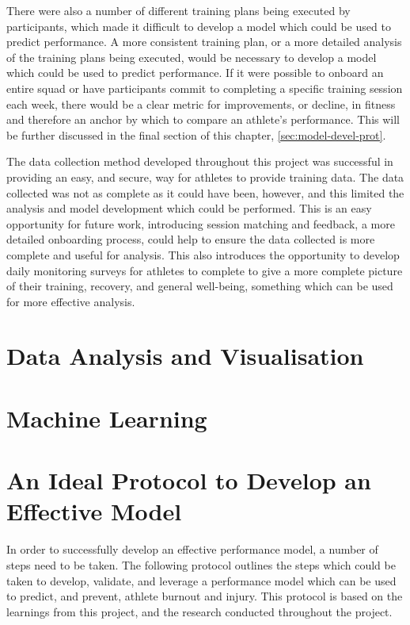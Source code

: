 There were also a number of different training plans being executed by participants, which made it difficult to develop a model which could be used to predict performance. A more consistent training plan, or a more detailed analysis of the training plans being executed, would be necessary to develop a model which could be used to predict performance. If it were possible to onboard an entire squad or have participants commit to completing a specific training session each week, there would be a clear metric for improvements, or decline, in fitness and therefore an anchor by which to compare an athlete's performance. This will be further discussed in the final section of this chapter, \autoref{sec:model-devel-prot}.

The data collection method developed throughout this project was successful in providing an easy, and secure, way for athletes to provide training data. The data collected was not as complete as it could have been, however, and this limited the analysis and model development which could be performed. This is an easy opportunity for future work, introducing session matching and feedback, a more detailed onboarding process, could help to ensure the data collected is more complete and useful for analysis. This also introduces the opportunity to develop daily monitoring surveys for athletes to complete to give a more complete picture of their training, recovery, and general well-being, something which can be used for more effective analysis.

\section{Data Analysis and Visualisation}
\section{Machine Learning}
\section{\label{sec:model-devel-prot}An Ideal Protocol to Develop an Effective Model}
In order to successfully develop an effective performance model, a number of steps need to be taken. The following protocol outlines the steps which could be taken to develop, validate, and leverage a performance model which can be used to predict, and prevent, athlete burnout and injury. This protocol is based on the learnings from this project, and the research conducted throughout the project.


